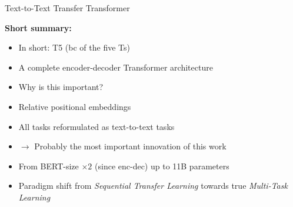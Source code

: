 \begin{frame}{Text-to-Text Transfer Transformer}

\vfill

	\textbf{Short summary:}

	\begin{itemize}
		\item In short: T5 (bc of the five Ts)
		\item A complete encoder-decoder Transformer architecture
		\item[] \ques Why is this important?
		\item Relative positional embeddings
		\item All tasks reformulated as text-to-text tasks
		\item[] $\to$ Probably the most important innovation of this work
		\item From BERT-size $\times2$ (since enc-dec) up to 11B parameters
		\item Paradigm shift from \textit{Sequential Transfer Learning} towards true \textit{Multi-Task Learning}
	\end{itemize}
	
	\vspace{.5cm}

	\begin{center}
		\href{https://1.bp.blogspot.com/-o4oiOExxq1s/Xk26XPC3haI/AAAAAAAAFU8/NBlvOWB84L0PTYy9TzZBaLf6fwPGJTR0QCLcBGAsYHQ/s1600/image3.gif}{\textbf{}}
	\end{center}
	
\vfill

\end{frame}


